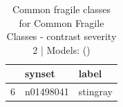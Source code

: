 \begin{table}
\caption{Common fragile classes for Common Fragile Classes - contrast severity 2 | Models: ()}
\label{tab:Common Fragile Classes - contrast severity 2_d41d8cd9}
\begin{tabular}{cll}
\toprule
 & synset & label \\
\midrule
6 & n01498041 & stingray \\
\bottomrule
\end{tabular}
\end{table}
